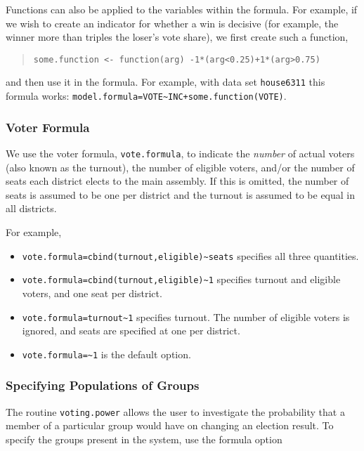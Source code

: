 \documentclass[oneside,letterpaper,titlepage]{article}
\begin{document}
Functions can also be applied to the variables within the formula. For example, if we wish to create an indicator for whether a win is decisive (for example, the winner more than triples the loser's vote share), we first create such a function,

\begin{quote}
\texttt{some.function <- function(arg) -1*(arg<0.25)+1*(arg>0.75)}
\end{quote}

and then use it in the formula.  For example, with data set \texttt{house6311}
this formula works: \texttt{model.formula=VOTE\~{}INC+some.function(VOTE)}.

\subsubsection*{Voter Formula}

We use the voter formula, \texttt{vote.formula}, to indicate the \emph{number} of actual voters (also known as the turnout), the number of eligible voters, and/or the number of seats each district elects to the main assembly. If this is omitted, the number of seats is assumed to be one per district and the turnout is assumed to be equal in all districts.

For example,
\begin{itemize}
\item \texttt{vote.formula=cbind(turnout,eligible)\~{}seats} specifies all three quantities.

\item \texttt{vote.formula=cbind(turnout,eligible)\~{}1} specifies turnout and eligible voters, and one seat per district.

\item \texttt{vote.formula=turnout\~{}1} specifies turnout. The number of eligible voters is ignored, and seats are specified at one per district.

\item \texttt{vote.formula=\~{}1} is the default option.
\end{itemize}

\subsubsection*{Specifying Populations of Groups}

The routine \texttt{voting.power} allows the user to investigate the probability that a member of a particular group would have on changing an election result. To specify the groups present in the system, use the formula option
\end{document}
